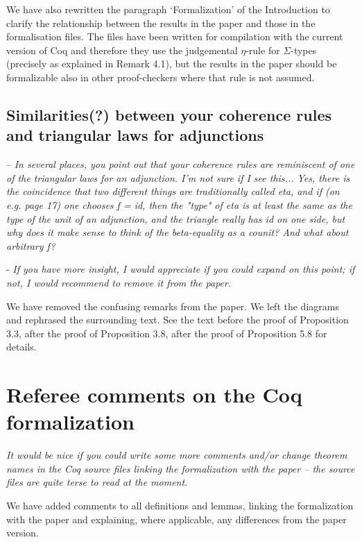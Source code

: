 \documentclass[10pt,a4paper,oneside,reqno]{amsart}
\numberwithin{equation}{section}
\theoremstyle{mythm}
\theoremstyle{mydef}
\theoremstyle{myrmk}
\begin{document}
We have also rewritten the paragraph `Formalization' of the Introduction to clarify the relationship between the results in the paper and those in the formalisation files. The files have been written for compilation with the current version of Coq and therefore they use the judgemental $\eta$-rule for $\Sigma$-types (precisely as explained in Remark 4.1), but the results in the paper should be formalizable also in other proof-checkers
where that rule is not assumed.


\subsection*{Similarities(?) between your coherence rules and triangular laws for adjunctions}  \hfill

-- \emph{In several places, you point out that your coherence rules are reminiscent of one of the triangular laws for an adjunction. I'm not sure if I see this... Yes, there is the coincidence that two different things are traditionally called eta, and if (on e.g. page 17) one chooses f = id, then the "type" of eta is at least the same as the type of the unit of an adjunction, and the triangle really has id on one side, but why does it make sense to think of the
 beta-equality as a counit? And what about arbitrary f?}

- \emph{If you have more insight, I would appreciate if you could expand on this point; if not, I would recommend to remove it from the paper.}


We have removed the confusing remarks from the paper. We left the diagrams and rephrased the surrounding text.  See the text before the proof of Proposition 3.3, after the proof of Proposition 3.8, after the proof of Proposition 5.8  for details.

\section{Referee comments on the Coq formalization}

\emph{It would be nice if you could write some more comments and/or change theorem names in the Coq
source files linking the formalization with the paper -- the source files are quite terse to read at the moment.} 

We have added comments to all definitions and lemmas, linking the formalization with the paper and explaining, where applicable, any differences from the paper version. 
\end{document}

